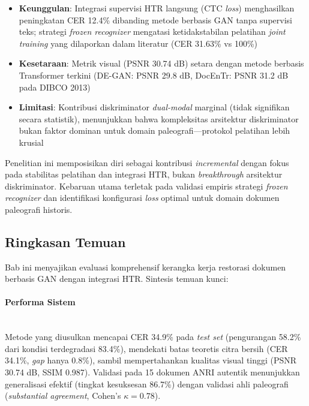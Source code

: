 \documentclass[12pt,a4paper]{article}
\begin{document}
\begin{itemize}[nosep]
    \item \textbf{Keunggulan}: Integrasi supervisi HTR langsung (CTC \textit{loss}) menghasilkan peningkatan CER 12.4\% dibanding metode berbasis GAN tanpa supervisi teks; strategi \textit{frozen recognizer} mengatasi ketidakstabilan pelatihan \textit{joint training} yang dilaporkan dalam literatur (CER 31.63\% vs 100\%)
    \item \textbf{Kesetaraan}: Metrik visual (PSNR 30.74 dB) setara dengan metode berbasis Transformer terkini (DE-GAN: PSNR 29.8 dB, DocEnTr: PSNR 31.2 dB pada DIBCO 2013)
    \item \textbf{Limitasi}: Kontribusi diskriminator \textit{dual-modal} marginal (tidak signifikan secara statistik), menunjukkan bahwa kompleksitas arsitektur diskriminator bukan faktor dominan untuk domain paleografi—protokol pelatihan lebih krusial
\end{itemize}

Penelitian ini memposisikan diri sebagai kontribusi \textit{incremental} dengan fokus pada stabilitas pelatihan dan integrasi HTR, bukan \textit{breakthrough} arsitektur diskriminator. Kebaruan utama terletak pada validasi empiris strategi \textit{frozen recognizer} dan identifikasi konfigurasi \textit{loss} optimal untuk domain dokumen paleografi historis.

\vspace{0.8em}

\subsection{Ringkasan Temuan}
\label{subsec:ringkasan-temuan}
\vspace{0.8em}

Bab ini menyajikan evaluasi komprehensif kerangka kerja restorasi dokumen berbasis GAN dengan integrasi HTR. Sintesis temuan kunci:

\paragraph{Performa Sistem} \mbox{}\\[0.1em]
Metode yang diusulkan mencapai CER 34.9\% pada \textit{test set} (pengurangan 58.2\% dari kondisi terdegradasi 83.4\%), mendekati batas teoretis citra bersih (CER 34.1\%, \textit{gap} hanya 0.8\%), sambil mempertahankan kualitas visual tinggi (PSNR 30.74 dB, SSIM 0.987). Validasi pada 15 dokumen ANRI autentik menunjukkan generalisasi efektif (tingkat kesuksesan 86.7\%) dengan validasi ahli paleografi (\textit{substantial agreement}, Cohen's $\kappa = 0.78$).
\end{document}
